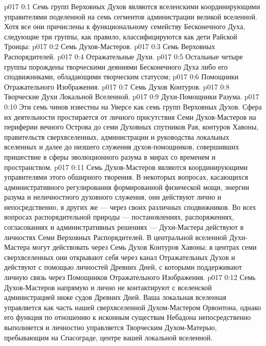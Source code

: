 \author{Божественный Советник}
\vs p017 0:1 Семь групп Верховных Духов являются вселенскими координирующими управителями поделенной на семь сегментов администрации великой вселенной. Хотя все они причислены к функциональному семейству Бесконечного Духа, следующие три группы, как правило, классифицируются как дети Райской Троицы:
\vs p017 0:2 \bibnobreakspace Семь Духов\hyp{}Мастеров.
\vs p017 0:3 \bibnobreakspace Семь Верховных Распорядителей.
\vs p017 0:4 \bibnobreakspace Отражательные Духи.
\vs p017 0:5 \pc Остальные четыре группы порождены творческими деяниями Бесконечного Духа либо его сподвижниками, обладающими творческим статусом;
\vs p017 0:6 \bibnobreakspace Помощники Отражательного Изображения.
\vs p017 0:7 \bibnobreakspace Семь Духов Контуров.
\vs p017 0:8 \bibnobreakspace Творческие Духи Локальной Вселенной.
\vs p017 0:9 \bibnobreakspace Духи\hyp{}Помощники Разума.
\vs p017 0:10 \pc Эти семь чинов известны на Уверсе как семь групп Верховных Духов. Сфера их деятельности простирается от личного присутствия Семи Духов\hyp{}Мастеров на периферии вечного Острова до семи Духовных спутников Рая, контуров Хавоны, правительств сверхвселенных, администрации и руководства локальных вселенных и далее до низшего служения духов\hyp{}помощников, совершивших пришествие в сферы эволюционного разума в мирах со временем и пространством.
\vs p017 0:11 Семь Духов\hyp{}Мастеров являются координирующими управителями этого обширного творения. В некоторых вопросах, касающихся административного регулирования формированной физической мощи, энергии разума и неличностного духовного служения, они действуют лично и непосредственно, в других же --- через своих различных сподвижников. Во всех вопросах распорядительной природы --- постановлениях, распоряжениях, согласованиях и административных решениях --- Духи\hyp{}Мастера действуют в личностях Семи Верховных Распорядителей. В центральной вселенной Духи\hyp{}Мастера могут действовать через Семь Духов Контуров Хавоны; в центрах семи сверхвселенных они открывают себя через канал Отражательных Духов и действуют с помощью личностей Древних Дней, с которыми поддерживают личную связь через Помощников Отражательного Изображения.
\vs p017 0:12 Семь Духов\hyp{}Мастеров напрямую и лично не контактируют с вселенской администрацией ниже судов Древних Дней. Ваша локальная вселенная управляется как часть нашей сверхвселенной Духом\hyp{}Мастером Орвонтона, однако его функция по отношению к исконным существам Небадона непосредственно выполняется и личностно управляется Творческим Духом\hyp{}Матерью, пребывающим на Спасограде, центре вашей локальной вселенной.
